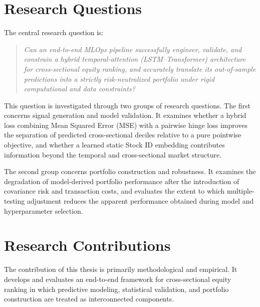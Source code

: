 \section{Research Questions} \label{sec:research-questions}
The central research question is:
\begin{quote}
	\textit{Can an end-to-end MLOps pipeline successfully engineer, validate, and constrain a hybrid temporal-attention (\acs{LSTM}--Transformer) architecture for cross-sectional equity ranking, and accurately translate its out-of-sample predictions into a strictly risk-neutralized portfolio under rigid computational and data constraints?}
\end{quote}

This question is investigated through two groups of research questions. The first concerns signal generation and model validation. It examines whether a hybrid loss combining Mean Squared Error (MSE) with a pairwise hinge loss improves the separation of predicted cross-sectional deciles relative to a pure pointwise objective, and whether a learned static Stock ID embedding contributes information beyond the temporal and cross-sectional market structure.

\medskip

The second group concerns portfolio construction and robustness. It examines the degradation of model-derived portfolio performance after the introduction of covariance risk and transaction costs, and evaluates the extent to which multiple-testing adjustment reduces the apparent performance obtained during model and hyperparameter selection.

\section{Research Contributions} \label{sec:research-contributions}
The contribution of this thesis is primarily methodological and empirical. It develops and evaluates an end-to-end framework for cross-sectional equity ranking in which predictive modeling, statistical validation, and portfolio construction are treated as interconnected components.

\medskip

